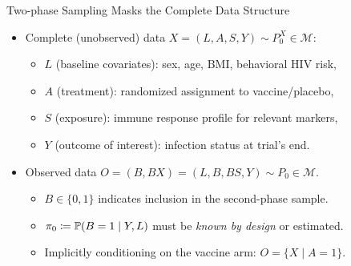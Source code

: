 \documentclass{beamer}
\begin{document}
\begin{frame}[c]{Two-phase Sampling Masks the Complete Data Structure}

\begin{center}
\begin{itemize}
  \itemsep8pt
  \item Complete (unobserved) data $X = (L, A, S, Y) \sim P_0^X \in
    \mathcal{M}$:
    \begin{itemize}
      \itemsep4pt
      \item $L$ (baseline covariates): sex, age, BMI, behavioral HIV risk,
      \item $A$ (treatment): randomized assignment to vaccine/placebo,
      \item $S$ (exposure): immune response profile for relevant markers,
      \item $Y$ (outcome of interest): infection status at trial's end.
    \end{itemize}
  \item Observed data $O = (B, BX) = (L, B, BS, Y) \sim P_0 \in \mathcal{M}$.
    \begin{itemize}
      \itemsep4pt
      \item $B \in \{0,1\}$ indicates inclusion in the second-phase sample.
      \item $\pi_0 \coloneqq \mathbb{P}(B = 1 \mid Y, L)$ must be \textit{known by
        design} or estimated.
      \item Implicitly conditioning on the vaccine arm: $O = \{X \mid A = 1\}$.
    \end{itemize}
\end{itemize}
\end{center}


\end{frame}



\end{document}
